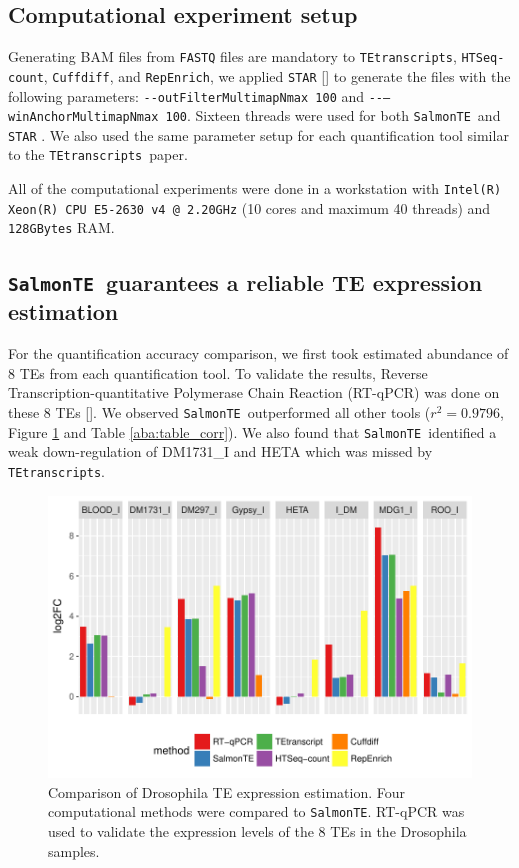 \documentclass[wsdraft]{ws-procs11x85}
\newcommand{\TEtranscripts}{\texttt{TEtranscripts}}
\newcommand{\SalmonTE}{\texttt{SalmonTE}}
\newcommand{\HTSeq}{\texttt{HTSeq-count}}
\newcommand{\Cuffdiff}{\texttt{Cuffdiff}}
\newcommand{\RepEnrich}{\texttt{RepEnrich}}
\begin{document}
\subsection{Computational experiment setup}

Generating BAM files from \verb|FASTQ| files are mandatory to  \TEtranscripts, \HTSeq, \Cuffdiff, and \RepEnrich, we applied \verb|STAR| [] to generate the files with the following parameters: \verb|--outFilterMultimapNmax 100| and \verb|--–winAnchorMultimapNmax 100|. Sixteen threads were used for  both \SalmonTE~and \verb|STAR| . We also used the same parameter setup for each quantification tool similar to the \TEtranscripts~paper.

All of the computational experiments were done in a workstation with \texttt{Intel(R) Xeon(R) CPU E5-2630 v4 @ 2.20GHz} (10 cores and maximum 40 threads) and \texttt{128GBytes} RAM. 

\subsection{\SalmonTE~guarantees a reliable TE expression estimation}

For the quantification accuracy comparison, we first took estimated abundance of 8 TEs from each quantification tool. To validate the results, Reverse Transcription-quantitative Polymerase Chain Reaction (RT-qPCR) was done on these 8 TEs [].
We observed \SalmonTE~outperformed all other tools ($r^2=0.9796$, Figure \ref{aba:fig4} and Table \ref{aba:table_corr}). We also found that \SalmonTE~identified a weak down-regulation of DM1731\_I and HETA which was missed by \TEtranscripts.

\begin{figure}[h]
\centerline{
\includegraphics[width=14cm]{fig_bar}
}
\caption{Comparison of Drosophila TE expression estimation. Four computational methods were compared to \SalmonTE.  
RT-qPCR was used to validate the expression levels of the 8 TEs in the
Drosophila samples.}
\label{aba:fig4}
\end{figure}
\end{document}
